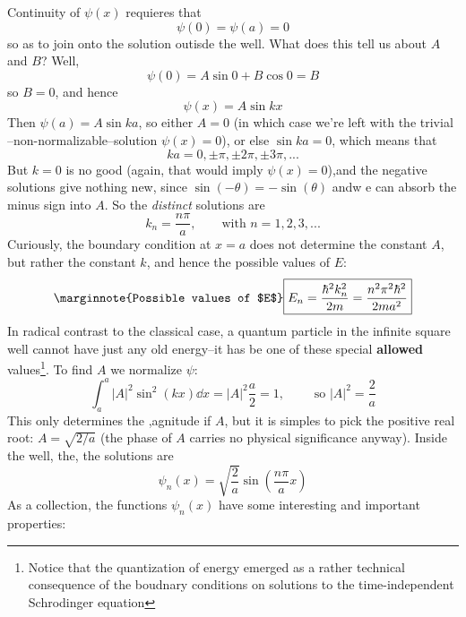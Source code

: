 Continuity of $\psi(x)$ requieres that
\begin{equation}\label{2.23}
	\psi(0)=\psi(a)=0
\end{equation}
so as to join onto the solution outisde the well. What does this tell us about $A$ and $B$? Well,
\begin{equation*}
	\psi(0)=A\sin 0+B\cos 0=B
\end{equation*}
so $B=0$, and hence
\begin{equation}\label{2.24}
	\psi(x)=A\sin kx
\end{equation}
Then $\psi(a)=A\sin ka$, so either $A=0$ (in which case we're left with the trivial --non-normalizable--solution $\psi(x)=0$), or else $\sin ka=0$, which means that
\begin{equation}\label{2.25}
	ka = 0,\pm \pi,\pm 2\pi,\pm 3\pi,...
\end{equation}
But $k=0$ is no good (again, that would imply $\psi(x)=0$),and the negative solutions give nothing new, since $\sin(-\theta)=-\sin(\theta)$ andw e can absorb the minus sign into $A$. So the \textit{distinct} solutions are
\begin{equation}\label{2.26}
	k_n=\frac{n\pi}{a},\qquad \mbox{with } n=1,2,3,...
\end{equation}
Curiously, the boundary condition at $x=a$ does not determine the constant $A$, but rather the constant $k$, and hence the possible values of $E$:
\begin{equation}\label{2.27}\marginnote{Possible values of $E$}
	\boxed{E_n=\frac{\hbar^2k_n^2}{2m}=\frac{n^2\pi^2\hbar^2}{2ma^2}}
\end{equation}
In radical contrast to the classical case, a quantum particle in the infinite square well cannot have just any old energy--it has be one of these special \textbf{allowed} values\footnote{Notice that the quantization of energy emerged as a rather technical consequence of the boudnary conditions on solutions to the time-independent Schrodinger equation}. To find $A$ we normalize $\psi$:
$$\int_a^{a}|A|^2\sin^2(kx)\dd x=|A|^2\frac{a}{2}=1,\qquad \mbox{ so  }|A|^2=\frac{2}{a}$$ 
This only determines the ,agnitude if $A$,  but it is simples to pick the positive real root: $A=\sqrt{2/a}$ (the phase of $A$ carries no physical significance anyway). Inside the well, the, the solutions are
\begin{equation}\label{2.28}
	\boxed{\psi_n(x)=\sqrt{\frac{2}{a}}\sin\left(\frac{n\pi}{a}x\right)}
\end{equation}
As a collection, the functions $\psi_n(x)$ have some interesting and important properties:
